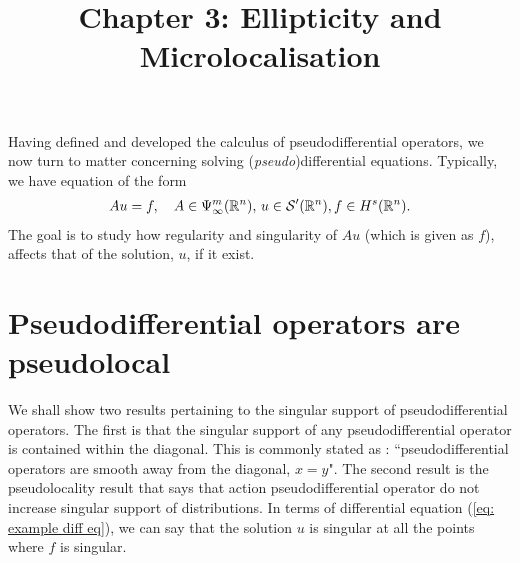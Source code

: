 \documentclass[12pt]{article}
\title{Chapter 3: Ellipticity and Microlocalisation}
\date{}
\begin{document}
\maketitle

Having defined and developed the calculus of pseudodifferential operators, we now turn to matter concerning solving (\textit{pseudo})differential equations. Typically, we have equation of the form
\begin{align}
Au = f, \quad A \in \Psi^{m}_{\infty}({\mathbb R}^n), \, u \in \mathcal{S}'({\mathbb R}^n), f \in H^s({\mathbb R}^n). \label{eq: example diff eq}
\end{align}
The goal is to study how regularity and singularity of $Au$ (which is given as $f$), affects that of the solution, $u$, if it exist. 

\section{Pseudodifferential operators are pseudolocal}
We shall show two results pertaining to the singular support of pseudodifferential operators. The first is that the singular support of any pseudodifferential operator  is contained within the diagonal. This is commonly stated as : ``pseudodifferential operators are smooth away from the diagonal, $x = y$". The second result is the pseudolocality result that says that action pseudodifferential operator do not increase singular support of distributions. In terms of differential equation (\ref{eq: example diff eq}), we can say that the solution $u$ is singular at all the points where $f$ is singular. 
\end{document}
